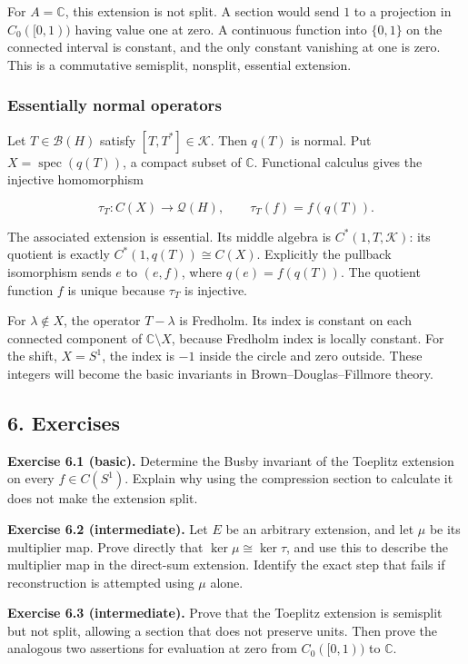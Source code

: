 \documentclass[
  11pt,
]{article}
\begin{document}
For \(A=\mathbb C\), this extension is not split. A section would send
\(1\) to a projection in \(C_0([0,1))\) having value one at zero. A
continuous function into \(\{0,1\}\) on the connected interval is
constant, and the only constant vanishing at one is zero. This is a
commutative semisplit, nonsplit, essential extension.

\subsubsection{Essentially normal
operators}\label{essentially-normal-operators}

Let \(T\in\mathcal B(H)\) satisfy \([T,T^*]\in\mathcal K\). Then
\(q(T)\) is normal. Put \(X=\operatorname{spec}(q(T))\), a compact
subset of \(\mathbb C\). Functional calculus gives the injective
homomorphism

\[
\tau_T:C(X)\longrightarrow\mathcal Q(H),\qquad
\tau_T(f)=f(q(T)).
\]

The associated extension is essential. Its middle algebra is
\(C^*(1,T,\mathcal K)\): its quotient is exactly
\(C^*(1,q(T))\cong C(X)\). Explicitly the pullback isomorphism sends
\(e\) to \((e,f)\), where \(q(e)=f(q(T))\). The quotient function \(f\)
is unique because \(\tau_T\) is injective.

For \(\lambda\notin X\), the operator \(T-\lambda\) is Fredholm. Its
index is constant on each connected component of
\(\mathbb C\setminus X\), because Fredholm index is locally constant.
For the shift, \(X=S^1\), the index is \(-1\) inside the circle and zero
outside. These integers will become the basic invariants in
Brown--Douglas--Fillmore theory.

\subsection{6. Exercises}\label{exercises}

\textbf{Exercise 6.1 (basic).} Determine the Busby invariant of the
Toeplitz extension on every \(f\in C(S^1)\). Explain why using the
compression section to calculate it does not make the extension split.

\textbf{Exercise 6.2 (intermediate).} Let \(E\) be an arbitrary
extension, and let \(\mu\) be its multiplier map. Prove directly that
\(\ker\mu\cong\ker\tau\), and use this to describe the multiplier map in
the direct-sum extension. Identify the exact step that fails if
reconstruction is attempted using \(\mu\) alone.

\textbf{Exercise 6.3 (intermediate).} Prove that the Toeplitz extension
is semisplit but not split, allowing a section that does not preserve
units. Then prove the analogous two assertions for evaluation at zero
from \(C_0([0,1))\) to \(\mathbb C\).
\end{document}
